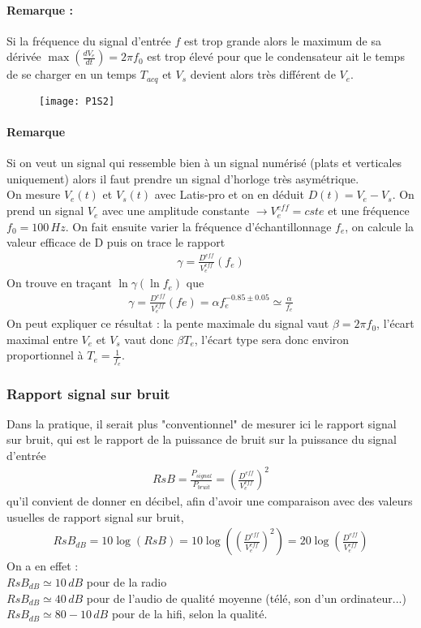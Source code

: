 \documentclass[12pt,prb,aps,epsf]{report}
\begin{document}
\paragraph{Remarque :} Si la fréquence du signal d'entrée $f$ est trop grande alors le maximum de sa dérivée $\max(\frac{dV_e}{dt}) = 2\pi f_0$ est trop élevé pour que le condensateur ait le temps de se charger en un temps $T_{acq}$ et $V_s$ devient alors très différent de $V_e$.
\begin{figure}[h]
	\centerline{\texttt{[image: P1S2]}}
\end{figure}
\paragraph{Remarque} Si on veut un signal qui ressemble bien à un signal numérisé (plats et verticales uniquement) alors il faut prendre un signal d'horloge très asymétrique.\\

On mesure $V_e(t)$ et $V_s(t)$ avec Latis-pro et on en déduit $D(t) = V_e-V_s$. On prend un signal $V_e$ avec une amplitude constante $\rightarrow V_e^{eff}=cste$ et une fréquence $f_0=100 \,Hz$. On fait ensuite varier la fréquence d'échantillonnage $f_e$, on calcule la valeur efficace de D puis on trace le rapport 
\begin{eqnarray}
\gamma = \frac{D^{eff}}{V_e^{eff}}(f_e)
\end{eqnarray}
On trouve en traçant $\ln\gamma (\ln f_e)$ que
\begin{eqnarray}
\gamma = \frac{D^{eff}}{V_e^{eff}}(fe) = \alpha f_e^{-0.85\pm0.05}  \simeq  \frac{\alpha}{f_e}
\end{eqnarray}
On peut expliquer ce résultat : la pente maximale du signal vaut $\beta = 2\pi f_0$, l'écart maximal entre $V_e$ et $V_s$ vaut donc $\beta T_e$, l'écart type sera donc environ proportionnel à $T_e=\frac{1}{f_e}$.

\subsubsection{Rapport signal sur bruit}
Dans la pratique, il serait plus "conventionnel" de mesurer ici le rapport signal sur bruit, qui est le rapport de la puissance de bruit sur la puissance du signal d'entrée
\begin{eqnarray}
RsB = \frac{P_{signal}}{P_{bruit}} = \left(\frac{D^{eff}}{V_e^{eff}}\right)^2
\end{eqnarray}
qu'il convient de donner en décibel, afin d'avoir une comparaison avec des valeurs usuelles de rapport signal sur bruit,
\begin{eqnarray}
RsB_{dB} = 10\log\left(RsB\right) = 10\log\left(\left(\frac{D^{eff}}{V_e^{eff}}\right)^2\right) = 20\log\left(\frac{D^{eff}}{V_e^{eff}}\right)
\end{eqnarray}
On a en effet :\\
$RsB_{dB} \simeq 10\,dB$ pour de la radio\\
$RsB_{dB} \simeq 40\,dB$ pour de l'audio de qualité moyenne (télé, son d'un ordinateur...)\\
$RsB_{dB} \simeq 80-10\,dB$ pour de la hifi, selon la qualité.
\end{document}
